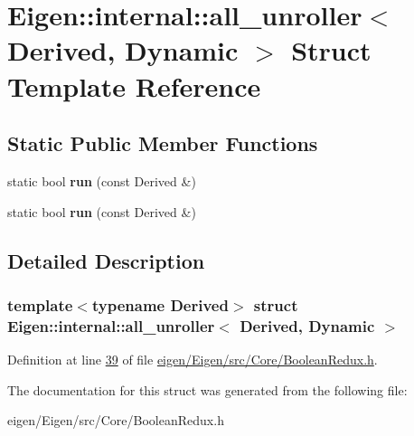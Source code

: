 \hypertarget{struct_eigen_1_1internal_1_1all__unroller_3_01_derived_00_01_dynamic_01_4}{}\section{Eigen\+:\+:internal\+:\+:all\+\_\+unroller$<$ Derived, Dynamic $>$ Struct Template Reference}
\label{struct_eigen_1_1internal_1_1all__unroller_3_01_derived_00_01_dynamic_01_4}
\subsection*{Static Public Member Functions}
\begin{DoxyCompactItemize}
\item 
\mbox{\label{struct_eigen_1_1internal_1_1all__unroller_3_01_derived_00_01_dynamic_01_4_aaa404402dee83da46a6081e31ca61ef4}} 
static bool {\bfseries run} (const Derived \&)
\item 
\mbox{\label{struct_eigen_1_1internal_1_1all__unroller_3_01_derived_00_01_dynamic_01_4_aaa404402dee83da46a6081e31ca61ef4}} 
static bool {\bfseries run} (const Derived \&)
\end{DoxyCompactItemize}


\subsection{Detailed Description}
\subsubsection*{template$<$typename Derived$>$\newline
struct Eigen\+::internal\+::all\+\_\+unroller$<$ Derived, Dynamic $>$}



Definition at line \hyperlink{eigen_2_eigen_2src_2_core_2_boolean_redux_8h_source_l00039}{39} of file \hyperlink{eigen_2_eigen_2src_2_core_2_boolean_redux_8h_source}{eigen/\+Eigen/src/\+Core/\+Boolean\+Redux.\+h}.



The documentation for this struct was generated from the following file\+:\begin{DoxyCompactItemize}
\item 
eigen/\+Eigen/src/\+Core/\+Boolean\+Redux.\+h\end{DoxyCompactItemize}
